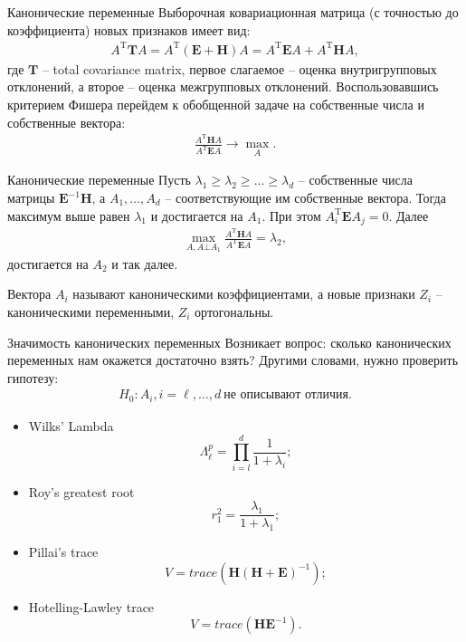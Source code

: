 \documentclass[11pt]{beamer}
\begin{document}
\begin{frame}{Канонические переменные}
	Выборочная ковариационная матрица (с точностью до коэффициента) новых признаков имеет вид:
	\begin{align*}
		A^\mathrm{T}\mathbf{T}A = A^\mathrm{T}(\mathbf{E} + \mathbf{H})A = A^\mathrm{T}\mathbf{E}A + A^\mathrm{T}\mathbf{H}A,
	\end{align*}
	где $\mathbf{T}$ -- total covariance matrix, первое слагаемое -- оценка внутригрупповых отклонений, а второе -- оценка межгрупповых отклонений. Воспользовавшись критерием Фишера перейдем к обобщенной задаче на собственные числа и собственные вектора:
	\begin{align*}
		\frac{A^\mathrm{T}\mathbf{H}A}{A^\mathrm{T}\mathbf{E}A} \rightarrow \max_{A}.
	\end{align*}
\end{frame}

\begin{frame}{Канонические переменные}
Пусть $\lambda_1 \geq \lambda_2 \geq \ldots \geq \lambda_d$ -- собственные числа матрицы $\mathbf{E}^{-1}\mathbf{H}$, а $A_1, \ldots, A_d$ -- соответствующие им собственные вектора. Тогда максимум выше равен $\lambda_1$  и достигается на $A_1$. При этом $A^\mathrm{T}_i \mathbf{E}A_j = 0$. Далее
\begin{align*}
	\max_{A, A \bot A_1}\frac{A^\mathrm{T}\mathbf{H}A}{A^\mathrm{T}\mathbf{E}A} = \lambda_2,
\end{align*}
достигается на $A_2$ и так далее.

Вектора $A_i$ называют каноническими коэффициентами, а новые признаки $Z_i$ -- каноническими переменными, $Z_i$ ортогональны.
\end{frame}

\begin{frame}{Значимость канонических переменных}
	Возникает вопрос: сколько канонических переменных нам окажется достаточно взять? Другими словами, нужно проверить гипотезу:
	\begin{align*}
		H_0: A_i, i = \ell,\ldots,d~\text{не описывают отличия}.
	\end{align*}
\begin{itemize}
	\item Wilks' Lambda $$\Lambda_\ell^p = \prod_{i = l}^d \frac{1}{1 + \lambda_i};$$
	
	\item Roy's greatest root $$r_1^2 = \frac{\lambda_1}{1+\lambda_1};$$
	
	\item Pillai's trace $$V=trace(\mathbf H(\mathbf H + \mathbf E)^{-1});$$
	
	\item Hotelling-Lawley trace $$V=trace(\mathbf H \mathbf E^{-1}).$$
\end{itemize}
\end{frame}
\end{document}
